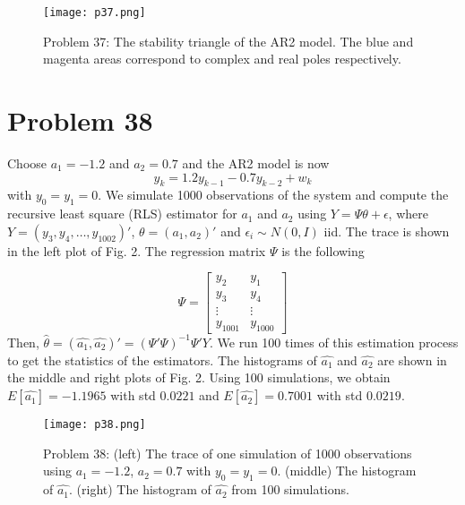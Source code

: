 \documentclass[a4paper, 11pt]{article}
\begin{document}
\begin{figure}
	\begin{center}
		\texttt{[image: p37.png]}
		\caption{Problem 37: The stability triangle of the AR2 model. The blue and magenta areas correspond to complex and real poles respectively.}
	\end{center}
\end{figure}



\section*{Problem 38}
Choose $a_1 = -1.2$ and $a_2=0.7$ and the AR2 model is now
\begin{equation}
y_k = 1.2y_{k-1} - 0.7y_{k-2} + w_k
\end{equation}
with $y_0 = y_1 = 0$. We simulate 1000 observations of the system and compute the recursive least square (RLS) estimator for $a_1$ and $a_2$ using $Y = \Psi \theta + \epsilon$, where $Y = (y_3, y_4, \dots, y_{1002})'$, $\theta = (a_1, a_2)'$ and $\epsilon_i \sim N(0, I)$ iid. The trace is shown in the left plot of Fig. 2. The regression matrix $\Psi$ is the following

\begin{equation}
\Psi = \begin{bmatrix}
y_2 & y_1 \\
y_3 & y_4 \\ 
\vdots & \vdots\\
y_{1001} & y_{1000}
\end{bmatrix}
\end{equation}
Then, $\hat{\theta} = (\hat{a_1}, \hat{a_2})' = (\Psi' \Psi)^{-1} \Psi' Y$. We run 100 times of this estimation process to get the statistics of the estimators. The histograms of $\hat{a_1}$ and $\hat{a_2}$ are shown in the middle and right plots of Fig. 2. Using 100 simulations, we obtain $E[\hat{a_1}] = -1.1965$ with std $0.0221$ and $E[\hat{a_2}] = 0.7001$ with std $0.0219$. 

\begin{figure}
	\begin{center}
		\texttt{[image: p38.png]}
		\caption{Problem 38: (left) The trace of one simulation of 1000 observations using $a_1 = -1.2$, $a_2=0.7$ with $y_0 = y_1 = 0$. (middle) The histogram of $\hat{a_1}$. (right) The histogram of $\hat{a_2}$ from 100 simulations. }
	\end{center}
\end{figure}
\end{document}
